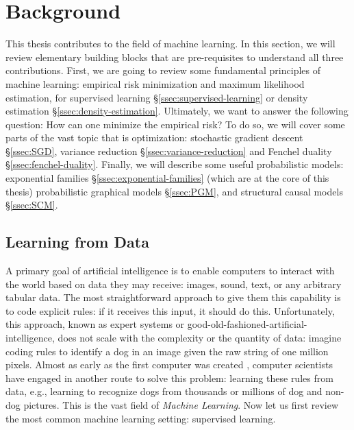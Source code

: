 \setcounter{theorem}{0}


\chapter{Background}

This thesis contributes to the field of machine learning.
In this section, we will review elementary building blocks that are pre-requisites to understand all three contributions.
First, we are going to review some fundamental principles of machine learning: empirical risk minimization and maximum likelihood estimation, for supervised learning \S\ref{ssec:supervised-learning} or density estimation \S\ref{ssec:density-estimation}.
Ultimately, we want to answer the following question: How can one minimize the empirical risk?  
To do so, we will cover some parts of the vast topic that is optimization: stochastic gradient descent \S\ref{ssec:SGD}, variance reduction \S\ref{ssec:variance-reduction} and Fenchel duality \S\ref{ssec:fenchel-duality}.
Finally, we will describe some useful probabilistic models: exponential families \S\ref{ssec:exponential-families} (which are at the core of this thesis) probabilistic graphical models \S\ref{ssec:PGM}, and  structural causal models \S\ref{ssec:SCM}.



\section{Learning from Data}
A primary goal of artificial intelligence is to enable computers to interact with the world based on data they may receive: images, sound, text, or any arbitrary tabular data. 
The most straightforward approach to give them this capability is to code explicit rules: if it receives this input, it should do this. 
Unfortunately, this approach, known as expert systems or good-old-fashioned-artificial-intelligence, does not scale with the complexity or the quantity of data:
imagine coding rules to identify a dog in an image given the raw string of one million pixels. 
Almost as early as the first computer was created \citep{rosenblatt1957perceptron}, computer scientists have engaged in another route to solve this problem: learning these rules from data, e.g., learning to recognize dogs from thousands or millions of dog and non-dog pictures. 
This is the vast field of \textit{Machine Learning}. 
Now let us first review the most common machine learning setting: supervised learning.


